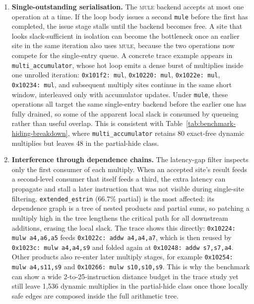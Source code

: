 \begin{enumerate}
  \item \textbf{Single-outstanding serialisation.}  The \textsc{mule}
  backend accepts at most one operation at a time.  If the loop body
  issues a second \texttt{mule} before the first has completed, the
  issue stage stalls until the backend becomes free.  A site that looks
  slack-sufficient in isolation can become the bottleneck once an
  earlier site in the same iteration also uses \textsc{mule}, because
  the two operations now compete for the single-entry queue.
  A concrete trace example appears in \texttt{multi\_accumulator},
  whose hot loop emits a dense burst of multiplies inside one unrolled
  iteration: \texttt{0x101f2: mul}, \texttt{0x10220: mul},
  \texttt{0x1022e: mul}, \texttt{0x10234: mul}, and subsequent multiply
  sites continue in the same short window, interleaved only with
  accumulator updates.  Under \texttt{mule}, these operations all target
  the same single-entry backend before the earlier one has fully
  drained, so some of the apparent local slack is consumed by queueing
  rather than useful overlap.  This is consistent with
  Table~\ref{tab:benchmark-hiding-breakdown}, where
  \texttt{multi\_accumulator} retains 80 exact-free dynamic multiplies
  but leaves 48 in the partial-hide class.

  \item \textbf{Interference through dependence chains.}  The
  latency-gap filter inspects only the first consumer of each
  multiply.  When an accepted site's result feeds a second-level
  consumer that itself feeds a third, the extra latency can propagate
  and stall a later instruction that was not visible during single-site
  filtering.  \texttt{extended\_estrin} (66.7\% partial) is the most
  affected: its dependence graph is a tree of nested products and
  partial sums, so patching a multiply high in the tree lengthens the
  critical path for all downstream additions, erasing the local slack.
  The trace shows this directly: \texttt{0x10224: mulw a4,a6,a5} feeds
  \texttt{0x1022c: addw a4,a4,a7}, which is then reused by
  \texttt{0x1023c: mulw a4,a4,s9} and folded again at
  \texttt{0x10248: addw s7,s7,a4}.  Other products also re-enter later
  multiply stages, for example \texttt{0x10254: mulw a4,s11,s9} and
  \texttt{0x10266: mulw s10,s10,s9}.  This is why the benchmark can show
  a wide 2-to-25-instruction distance budget in the trace study yet
  still leave 1,536 dynamic multiplies in the partial-hide class once
  those locally safe edges are composed inside the full arithmetic tree.


\end{enumerate}
